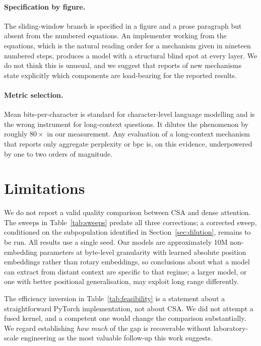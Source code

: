 \documentclass[11pt]{article}
\begin{document}
\paragraph{Specification by figure.}
The sliding-window branch is specified in a figure and a prose paragraph but
absent from the numbered equations. An implementer working from the equations,
which is the natural reading order for a mechanism given in nineteen numbered
steps, produces a model with a structural blind spot at every layer. We do not
think this is unusual, and we suggest that reports of new mechanisms state
explicitly which components are load-bearing for the reported results.

\paragraph{Metric selection.}
Mean bits-per-character is standard for character-level language modelling and
is the wrong instrument for long-context questions. It dilutes the phenomenon by
roughly $80\times$ in our measurement. Any evaluation of a long-context
mechanism that reports only aggregate perplexity or bpc is, on this evidence,
underpowered by one to two orders of magnitude.

\section{Limitations}

We do not report a valid quality comparison between CSA and dense attention.
The sweeps in Table~\ref{tab:sweeps} predate all three corrections; a corrected
sweep, conditioned on the subpopulation identified in
Section~\ref{sec:dilution}, remains to be run. All results use a single seed.
Our models are approximately 10M non-embedding parameters at byte-level
granularity with learned absolute position embeddings rather than rotary
embeddings, so conclusions about what a model can extract from distant context
are specific to that regime; a larger model, or one with better positional
generalisation, may exploit long range differently.

The efficiency inversion in Table~\ref{tab:feasibility} is a statement about a
straightforward PyTorch implementation, not about CSA. We did not attempt a
fused kernel, and a competent one would change the comparison substantially. We
regard establishing \emph{how much} of the gap is recoverable without
laboratory-scale engineering as the most valuable follow-up this work suggests.
\end{document}
